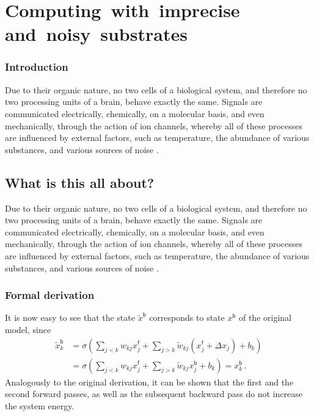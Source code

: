 \documentclass[b5paper,widemargins,twoside,printrev]{jb-thesis}
\begin{document}
 \part{Computing~with~imprecise and~noisy~substrates}

 \mbox{}
 \section*{Introduction}

 Due to their organic nature, no two cells of a biological system, and therefore no two processing units of a brain, behave exactly the same.
 Signals are communicated electrically, chemically, on a molecular basis, and even mechanically, through the action of ion channels, whereby all of these processes are influenced by external factors, such as temperature, the abundance of various substances, and various sources of noise \citep{shadlen1994noise}.

 \chapter{What is this all about?}

 Due to their organic nature, no two cells of a biological system, and therefore no two processing units of a brain, behave exactly the same.
 Signals are communicated electrically, chemically, on a molecular basis, and even mechanically, through the action of ion channels, whereby all of these processes are influenced by external factors, such as temperature, the abundance of various substances, and various sources of noise \citep{shadlen1994noise}.

 \section{Formal derivation}

 It is now easy to see that the state $\tilde{x}^\mathsf{b}$ corresponds to state $x^\mathsf{b}$ of the original model, since
 \begin{align}
     \tilde{x}^\mathsf{b}_k &= \sigma\left(\sum_{j<k} w_{kj} x^\mathsf{f}_j + \sum_{j>k} \tilde{w}_{kj} (x^\mathsf{f}_j + \Delta x_j) + b_k\right) \\
	&=  \sigma\left(\sum_{j<k} w_{kj} x^\mathsf{f}_j + \sum_{j>k} \tilde{w}_{kj} x^\mathsf{b}_j + b_k\right) = x^\mathsf{b}_k\,.
     \label{eqn:random1}
 \end{align}
 Analogously to the original derivation, it can be shown that the first and the second forward passes, as well as the subsequent backward pass do not increase the system energy.



 \printbibliography
 \vfill
\end{document}

